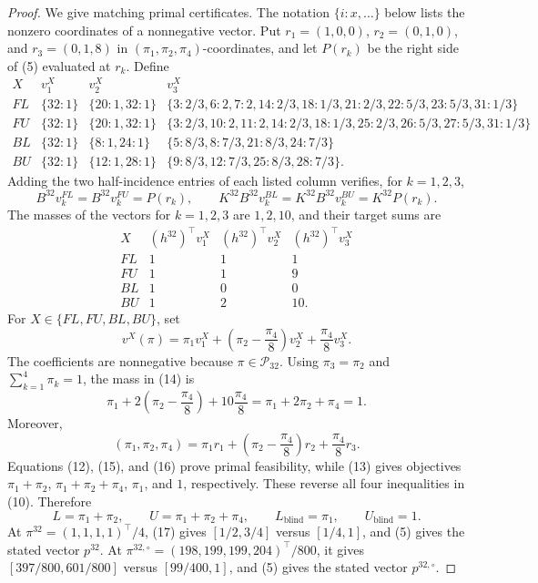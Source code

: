 \documentclass{article}
\begin{document}
\begin{proof}
We give matching primal certificates.  The notation \(\{i:x,\ldots\}\) below lists the nonzero coordinates of a nonnegative vector.  Put \(r_1=(1,0,0)\), \(r_2=(0,1,0)\), and \(r_3=(0,1,8)\) in \((\pi_1,\pi_2,\pi_4)\)-coordinates, and let \(P(r_k)\) be the right side of (5) evaluated at \(r_k\).  Define
\[
\begin{array}{c|c|c|l}
X&v_1^X&v_2^X&v_3^X\\\hline
FL&\{32:1\}&\{20:1,32:1\}&
\{3:2/3,6:2,7:2,14:2/3,18:1/3,21:2/3,22:5/3,23:5/3,31:1/3\}\\
FU&\{32:1\}&\{20:1,32:1\}&
\{3:2/3,10:2,11:2,14:2/3,18:1/3,25:2/3,26:5/3,27:5/3,31:1/3\}\\
BL&\{32:1\}&\{8:1,24:1\}&
\{5:8/3,8:7/3,21:8/3,24:7/3\}\\
BU&\{32:1\}&\{12:1,28:1\}&
\{9:8/3,12:7/3,25:8/3,28:7/3\}.
\end{array}
\tag{11}
\]
Adding the two half-incidence entries of each listed column verifies, for \(k=1,2,3\),
\[
B^{32}v_k^{FL}=B^{32}v_k^{FU}=P(r_k),
\qquad
K^{32}B^{32}v_k^{BL}=K^{32}B^{32}v_k^{BU}=K^{32}P(r_k).
\tag{12}
\]
The masses of the vectors for \(k=1,2,3\) are \(1,2,10\), and their target sums are
\[
\begin{array}{c|ccc}
X&(h^{32})^{\top}v_1^X&(h^{32})^{\top}v_2^X&(h^{32})^{\top}v_3^X\\\hline
FL&1&1&1\\
FU&1&1&9\\
BL&1&0&0\\
BU&1&2&10.
\end{array}
\tag{13}
\]
For \(X\in\{FL,FU,BL,BU\}\), set
\[
v^X(\pi)=\pi_1v_1^X+\left(\pi_2-\frac{\pi_4}{8}\right)v_2^X
+\frac{\pi_4}{8}v_3^X.
\tag{14}
\]
The coefficients are nonnegative because \(\pi\in\mathcal P_{32}\).  Using \(\pi_3=\pi_2\) and \(\sum_{k=1}^4\pi_k=1\), the mass in (14) is
\[
\pi_1+2\left(\pi_2-\frac{\pi_4}{8}\right)+10\frac{\pi_4}{8}
=\pi_1+2\pi_2+\pi_4=1.
\tag{15}
\]
Moreover,
\[
(\pi_1,\pi_2,\pi_4)
=\pi_1r_1+\left(\pi_2-\frac{\pi_4}{8}\right)r_2+\frac{\pi_4}{8}r_3.
\tag{16}
\]
Equations (12), (15), and (16) prove primal feasibility, while (13) gives objectives \(\pi_1+\pi_2\), \(\pi_1+\pi_2+\pi_4\), \(\pi_1\), and \(1\), respectively.  These reverse all four inequalities in (10).  Therefore
\[
L=\pi_1+\pi_2,
\qquad
U=\pi_1+\pi_2+\pi_4,
\qquad
L_{\mathrm{blind}}=\pi_1,
\qquad
U_{\mathrm{blind}}=1.
\tag{17}
\]
At \(\pi^{32}=(1,1,1,1)^{\top}/4\), (17) gives \([1/2,3/4]\) versus \([1/4,1]\), and (5) gives the stated vector \(p^{32}\).  At \(\pi^{32,\circ}=(198,199,199,204)^{\top}/800\), it gives \([397/800,601/800]\) versus \([99/400,1]\), and (5) gives the stated vector \(p^{32,\circ}\).


\end{proof}
\end{document}
